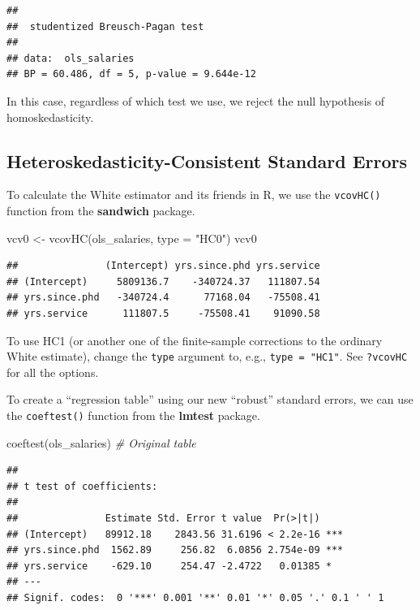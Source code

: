 \documentclass[
  12pt,
  oneside,openany]{book}
\newenvironment{Shaded}{\begin{snugshade}}{\end{snugshade}}
\newcommand{\AttributeTok}[1]{\textcolor[rgb]{0.77,0.63,0.00}{#1}}
\newcommand{\CommentTok}[1]{\textcolor[rgb]{0.56,0.35,0.01}{\textit{#1}}}
\newcommand{\FunctionTok}[1]{\textcolor[rgb]{0.00,0.00,0.00}{#1}}
\newcommand{\NormalTok}[1]{#1}
\newcommand{\OtherTok}[1]{\textcolor[rgb]{0.56,0.35,0.01}{#1}}
\newcommand{\StringTok}[1]{\textcolor[rgb]{0.31,0.60,0.02}{#1}}
\begin{document}
\begin{verbatim}
## 
##  studentized Breusch-Pagan test
## 
## data:  ols_salaries
## BP = 60.486, df = 5, p-value = 9.644e-12
\end{verbatim}

In this case, regardless of which test we use, we reject the null hypothesis of homoskedasticity.

\hypertarget{heteroskedasticity-consistent-standard-errors}{%
\subsection{Heteroskedasticity-Consistent Standard Errors}\label{heteroskedasticity-consistent-standard-errors}}

To calculate the White estimator and its friends in R, we use the \texttt{vcovHC()} function from the \textbf{sandwich} package.

\begin{Shaded}
\begin{Highlighting}[]
\NormalTok{vcv0 }\OtherTok{\textless{}{-}} \FunctionTok{vcovHC}\NormalTok{(ols\_salaries, }\AttributeTok{type =} \StringTok{"HC0"}\NormalTok{)}
\NormalTok{vcv0}
\end{Highlighting}
\end{Shaded}

\begin{verbatim}
##               (Intercept) yrs.since.phd yrs.service
## (Intercept)     5809136.7    -340724.37   111807.54
## yrs.since.phd   -340724.4      77168.04   -75508.41
## yrs.service      111807.5     -75508.41    91090.58
\end{verbatim}

To use HC1 (or another one of the finite-sample corrections to the ordinary White estimate), change the \texttt{type} argument to, e.g., \texttt{type\ =\ "HC1"}. See \texttt{?vcovHC} for all the options.

To create a ``regression table'' using our new ``robust'' standard errors, we can use the \texttt{coeftest()} function from the \textbf{lmtest} package.

\begin{Shaded}
\begin{Highlighting}[]
\FunctionTok{coeftest}\NormalTok{(ols\_salaries)  }\CommentTok{\# Original table}
\end{Highlighting}
\end{Shaded}

\begin{verbatim}
## 
## t test of coefficients:
## 
##               Estimate Std. Error t value  Pr(>|t|)    
## (Intercept)   89912.18    2843.56 31.6196 < 2.2e-16 ***
## yrs.since.phd  1562.89     256.82  6.0856 2.754e-09 ***
## yrs.service    -629.10     254.47 -2.4722   0.01385 *  
## ---
## Signif. codes:  0 '***' 0.001 '**' 0.01 '*' 0.05 '.' 0.1 ' ' 1
\end{verbatim}
\end{document}
